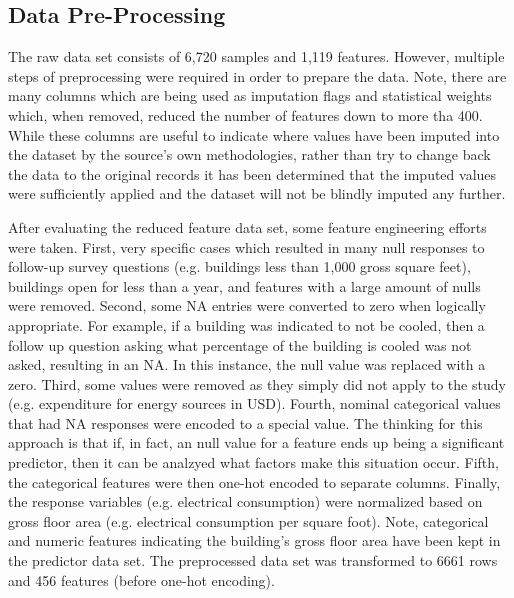\subsection{Data Pre-Processing}

The raw data set consists of 6,720 samples and 1,119 features.  However, multiple steps of preprocessing were required in order to prepare the data.  Note, there are many columns which are being used as imputation flags and statistical weights which, when removed, reduced the number of features down to more tha 400.  While these columns are useful to indicate where values have been imputed into the dataset by the source's own methodologies, rather than try to change back the data to the original records it has been determined that the imputed values were sufficiently applied and the dataset will not be blindly imputed any further.

After evaluating the reduced feature data set, some feature engineering efforts were taken.  First, very specific cases which resulted in many null responses to follow-up survey questions (e.g. buildings less than 1,000 gross square feet), buildings open for less than a year, and features with a large amount of nulls were removed.  Second, some NA entries were converted to zero when logically appropriate.  For example, if a building was indicated to not be cooled, then a follow up question asking what percentage of the building is cooled was not asked, resulting in an NA.  In this instance, the null value was replaced with a zero.  Third, some values were removed as they simply did not apply to the study (e.g. expenditure for energy sources in USD).  Fourth, nominal categorical values that had NA responses were encoded to a special value.  The thinking for this approach is that if, in fact, an null value for a feature ends up being a significant predictor, then it can be analzyed what factors make this situation occur.  Fifth, the categorical features were then one-hot encoded to separate columns.  Finally, the response variables (e.g. electrical consumption) were normalized based on gross floor area (e.g. electrical consumption per square foot).  Note, categorical and numeric features indicating the building's gross floor area have been kept in the predictor data set.  The preprocessed data set was transformed to 6661 rows and 456 features (before one-hot encoding).